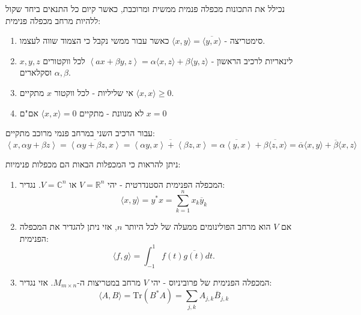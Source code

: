 \documentclass{tstextbook}
\begin{document}
\begin{proposition}
נכילל את התכונות מכפלה פנמית ממשית ומרוכבת, כאשר קיום כל התנאים ביחד שקול ללהיות מרחב מכפלה פנימית:

  \begin{enumerate}
    \item סימטריצה - \(\langle x,y \rangle=\overline{\langle y,x \rangle}\) כאשר עבור ממשי נקבל כי הצמוד שווה לעצמו. 


    \item לינאריות לרכיב הראשון - \(\left\langle  ax+\beta y  ,z\right\rangle=\alpha \langle x,z \rangle+\beta \langle y,z \rangle\) לכל ווקטורים \(x,y,z\) וסקלארים \(\alpha,\beta\). 


    \item אי שליליות - לכל ווקטור \(x\) מתקיים \(\langle x,x \rangle\geq 0\). 


    \item לא מנוונת - מתקיים \(\langle x,x \rangle=0\) אם"ם \(x=0\)


  \end{enumerate}
\end{proposition}
\begin{corollary}
עבור הרכיב השני במרחב פנמי מרוכב מתקיים:
$$\left\langle  x,\alpha y+\beta z  \right\rangle =\overline{\left\langle  \alpha y+\beta z,x  \right\rangle } =\overline{\left\langle  \alpha y,x  \right\rangle +\left\langle  \beta z,x  \right\rangle } =\overline{\alpha\left\langle   y,x  \right\rangle }+\overline{\beta \langle z,x \rangle }  =\overline{\alpha} \langle x,y \rangle +\overline{\beta} \langle x,z \rangle $$

\end{corollary}
\begin{example}
ניתן להראות כי המכפלות הבאות הם מכפלות פנימיות:

  \begin{enumerate}
    \item המכפלה הפנימית הסטנדרטית - יהי \(V=\mathbb{R}^n\) או \(V=\mathbb{C}^{n}\). נגדיר: 
$$\langle x,y \rangle = y^{*}x=\sum_{k=1}^{n}x_{k}\overline{y} _{k}$$


    \item אם \(V\) הוא מרחב  הפולינומים ממעלה של לכל היותר \(n\), אזי ניתן להגדיר את המכפלה הפנימית: 
$$\langle f,g \rangle =\int_{-1}^{1}f(t){\overline{{g(t)}}}d t.$$


    \item המכפלה הפנימית של פרוביניוס - יהי \(V\) מרחב במטריצות ה-\(M_{m\times n}\). אזי נגדיר: 
$$\langle A,B \rangle =\mathrm{Tr}(B^{*}A)=\sum_{j,k} A_{j,k}\overline{B} _{j,k}$$


  \end{enumerate}
\end{example}
\end{document}
